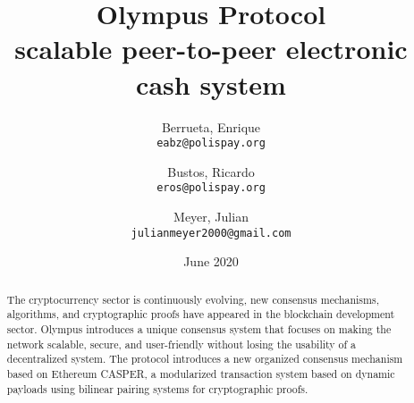 \documentclass{article}
\title{%
  Olympus Protocol \\
  \A scalable peer-to-peer electronic cash system}
\author{
  Berrueta, Enrique\\
  \texttt{eabz@polispay.org}
  \and
  Bustos, Ricardo\\
  \texttt{eros@polispay.org}
  \and
  Meyer, Julian\\
  \texttt{julianmeyer2000@gmail.com}
}
\date{June 2020}
\begin{document}
	\maketitle
	\begin{abstract}
		The cryptocurrency sector is continuously evolving, new consensus mechanisms, algorithms, and cryptographic proofs have appeared in the blockchain development sector. Olympus introduces a unique consensus system that focuses on making the network scalable, secure, and user-friendly without losing the usability of a decentralized system. The protocol introduces a new organized consensus mechanism based on Ethereum CASPER, a modularized transaction system based on dynamic payloads using bilinear pairing systems for cryptographic proofs.
	\end{abstract}
	
	\newpage
	\tableofcontents
	\newpage
	
	\newpage
	
	\printbibliography
	
\end{document}
